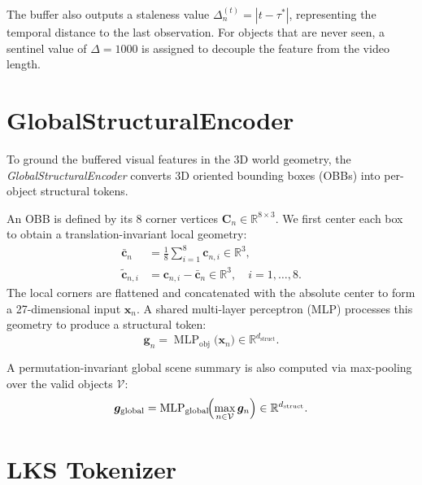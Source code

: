 \documentclass{article}
\newcommand{\mR}{\mathbb{R}}
\newcommand{\op}[1]{\operatorname{#1}}
\newcommand{\mat}[1]{\bm{#1}}
\begin{document}
The buffer also outputs a staleness value $\Delta_n^{(t)} = |t - \tau^*|$, representing the temporal distance to the last observation. For objects that are never seen, a sentinel value of $\Delta=1000$ is assigned to decouple the feature from the video length.


\section{GlobalStructuralEncoder}
\label{sec:gse}

To ground the buffered visual features in the 3D world geometry, the \emph{GlobalStructuralEncoder} converts 3D oriented bounding boxes (OBBs) into per-object structural tokens.

An OBB is defined by its 8 corner vertices $\mat{C}_n \in \mR^{8 \times 3}$. We first center each box to obtain a translation-invariant local geometry:
\begin{align}
    \bar{\mat{c}}_n &= \frac{1}{8}\sum_{i=1}^{8}\mat{c}_{n,i} \in \mR^{3}, \label{eq:center} \\
    \tilde{\mat{c}}_{n,i} &= \mat{c}_{n,i} - \bar{\mat{c}}_n \in \mR^{3}, \quad i=1,\dots,8. \label{eq:local}
\end{align}
The local corners are flattened and concatenated with the absolute center to form a 27-dimensional input $\mat{x}_n$. A shared multi-layer perceptron (MLP) processes this geometry to produce a structural token:
\begin{equation}
    \mat{g}_n = \op{MLP}_{\text{obj}}\bigl(\mat{x}_n\bigr) \in \mR^{d_{\text{struct}}}.
    \label{eq:gse_obj}
\end{equation}

A permutation-invariant global scene summary is also computed via max-pooling over the valid objects $\mathcal{V}$:
\begin{equation}
    \mat{g}_{\text{global}} = \op{MLP}_{\text{global}}\!\Bigl(\max_{n \in \mathcal{V}} \mat{g}_n\Bigr) \in \mR^{d_{\text{struct}}}.
    \label{eq:gse_global}
\end{equation}


\section{LKS Tokenizer}
\label{sec:tokenizer}
\end{document}
